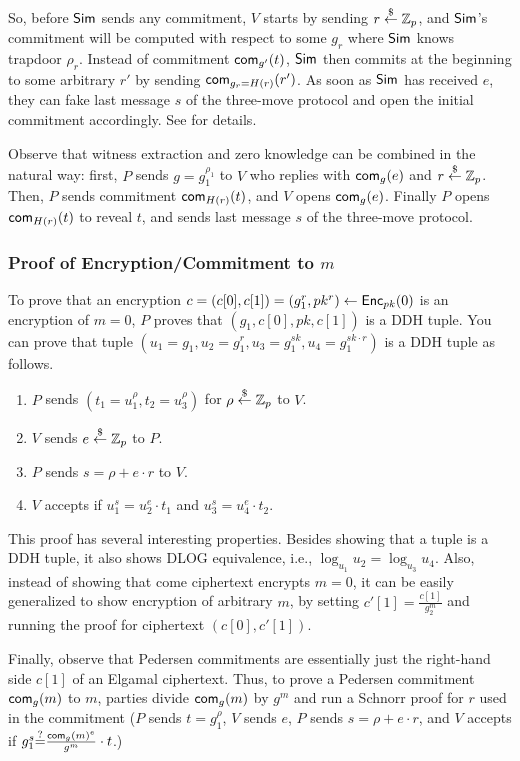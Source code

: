 So, before ${\mathsf{Sim}}$ sends any commitment, $V$ starts by sending
$r\stackrel{\$}{\leftarrow}\mathbb{Z}_p$, and ${\mathsf{Sim}}$'s commitment will be computed with respect to
some $g_r$ where ${\mathsf{Sim}}$ knows trapdoor $\rho_r$.  Instead of
commitment $\mathsf{com}_{g'}(t)$, ${\mathsf{Sim}}$ then commits at the beginning to
some arbitrary $r'$ by sending $\mathsf{com}_{g_r=H(r)}(r')$. As soon as
${\mathsf{Sim}}$ has received $e$, they can fake last message $s$ of the
three-move protocol and open the initial commitment accordingly.  See
\citet{crs} for details.

Observe that witness extraction and zero knowledge can be combined in
the natural way: first, $P$ sends $g=g_1^{\rho_1}$ to $V$ who replies
with $\mathsf{com}_g(e)$ and $r\stackrel{\$}{\leftarrow}\mathbb{Z}_p$. Then, $P$ sends commitment
$\mathsf{com}_{H(r)}(t)$, and $V$ opens $\mathsf{com}_g(e)$.  Finally $P$ opens
$\mathsf{com}_{H(r)}(t)$ to reveal $t$, and sends last message $s$ of the
three-move protocol.


\subsubsection{Proof of Encryption/Commitment to $m$}
\label{poe}

To prove that an encryption
$c=(c[0],c[1])=(g_1^r,pk^r)\leftarrow{\mathsf{Enc}}_{pk}(0)$ is an encryption of
$m=0$, $P$ proves that $(g_1,c[0],pk,c[1])$ is a DDH tuple.  You can
prove that tuple
$(u_1=g_1,u_2=g_1^r,u_3=g_1^{sk},u_4=g_1^{sk\cdot{}r})$ is a DDH tuple
as follows.

\begin{enumerate}
\item $P$ sends $(t_1=u_1^{\rho},t_2=u_3^{\rho})$ for $\rho\stackrel{\$}{\leftarrow}\mathbb{Z}_p$ to $V$.
  \item $V$ sends $e\stackrel{\$}{\leftarrow}\mathbb{Z}_p$ to $P$.
  \item $P$ sends $s=\rho+e\cdot{}r$ to $V$.
    \item $V$ accepts if $u_1^s=u_2^e\cdot{}t_1$ and $u_3^s=u_4^e\cdot{}t_2$.
\end{enumerate}

This proof has several interesting properties. Besides showing that a
tuple is a DDH tuple, it also shows DLOG equivalence, i.e.,
$\log_{u_1}{u_2}=\log_{u_3}{u_4}$. Also, instead of showing that come
ciphertext encrypts $m=0$, it can be easily generalized to show
encryption of arbitrary $m$, by setting $c'[1]=\frac{c[1]}{g_2^m}$ and
running the proof for ciphertext $(c[0],c'[1])$.

Finally, observe that Pedersen commitments are essentially just the
right-hand side $c[1]$ of an Elgamal ciphertext. Thus, to prove a
Pedersen commitment $\mathsf{com}_g(m)$ to $m$, parties divide $\mathsf{com}_g(m)$ by
$g^m$ and run a Schnorr proof for $r$ used in the commitment ($P$
sends $t=g_1^\rho$, $V$ sends $e$, $P$ sends $s=\rho+e\cdot{}r$, and $V$
accepts if $g_1^s{\stackrel{?}{=}}\frac{\mathsf{com}_g(m)^e}{g^m}\cdot{}t$.)




